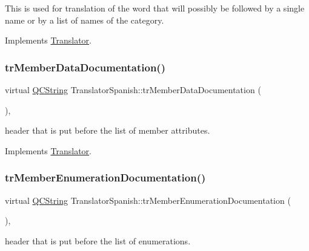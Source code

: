 This is used for translation of the word that will possibly be followed by a single name or by a list of names of the category. 

Implements \mbox{\hyperlink{class_translator}{Translator}}.

\mbox{\label{class_translator_spanish_a2bf3722820a7ee110e1ee24c51607e18}} 
\subsubsection{\texorpdfstring{trMemberDataDocumentation()}{trMemberDataDocumentation()}}
{\footnotesize\ttfamily virtual \mbox{\hyperlink{class_q_c_string}{Q\+C\+String}} Translator\+Spanish\+::tr\+Member\+Data\+Documentation (\begin{DoxyParamCaption}{ }\end{DoxyParamCaption})\hspace{0.3cm}{\ttfamily [inline]}, {\ttfamily [virtual]}}

header that is put before the list of member attributes. 

Implements \mbox{\hyperlink{class_translator}{Translator}}.

\mbox{\label{class_translator_spanish_a6e9192a1faa5c67e2db5b625c57cd58b}} 
\subsubsection{\texorpdfstring{trMemberEnumerationDocumentation()}{trMemberEnumerationDocumentation()}}
{\footnotesize\ttfamily virtual \mbox{\hyperlink{class_q_c_string}{Q\+C\+String}} Translator\+Spanish\+::tr\+Member\+Enumeration\+Documentation (\begin{DoxyParamCaption}{ }\end{DoxyParamCaption})\hspace{0.3cm}{\ttfamily [inline]}, {\ttfamily [virtual]}}

header that is put before the list of enumerations. 


